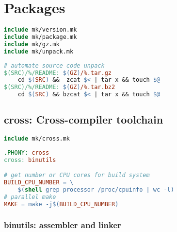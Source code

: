 \section{Packages}

\begin{lstlisting}[language=make,title=Makefile]
include mk/version.mk
include mk/package.mk
include mk/gz.mk
include mk/unpack.mk
\end{lstlisting}

\begin{lstlisting}[language=make,title=mk/unpack]
# automate source code unpack
$(SRC)/%/README: $(GZ)/%.tar.gz
	cd $(SRC) &&  zcat $< | tar x && touch $@
$(SRC)/%/README: $(GZ)/%.tar.bz2
	cd $(SRC) && bzcat $< | tar x && touch $@
\end{lstlisting}

\subsection{cross: Cross-compiler toolchain}

\begin{lstlisting}[language=make,title=Makefile]
include mk/cross.mk
\end{lstlisting}

\begin{lstlisting}[language=make,title=mk/cross]
.PHONY: cross
cross: binutils

# get number or CPU cores for build system
BUILD_CPU_NUMBER = \
	$(shell grep processor /proc/cpuinfo | wc -l)
# parallel make
MAKE = make -j$(BUILD_CPU_NUMBER)
\end{lstlisting}

\subsubsection{binutils: assembler and linker}

